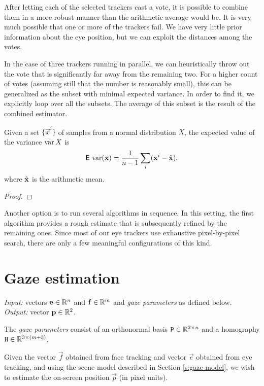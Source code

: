 After letting each of the selected trackers cast a vote, it is possible to combine them in a more robust manner than the arithmetic average would be.
It is very much possible that one or more of the trackers fail.
We have very little prior information about the eye position, but we can exploit the distances among the votes.

In the case of three trackers running in parallel, we can heuristically throw out the vote that is significantly far away from the remaining two.
For a higher count of votes (assuming still that the number is reasonably small), this can be generalized as the subset with minimal expected variance.
In order to find it, we explicitly loop over all the subsets.
The average of this subset is the result of the combined estimator.

\begin{lemma}
Given a set $\{\vec x^i\}$ of samples from a normal distribution $X$, the expected value of the variance $\operatorname{\textrm{var}} X$ is
$$\operatorname{\textsf{E}\,}\operatorname{\textrm{var}} (\mathbf{x}) = \frac 1 {n - 1} \sum_i (\mathbf{x}^i - \hat{\mathbf{x}}),$$
where $\hat{\mathbf{x}}$ is the arithmetic mean.
\end{lemma}
\begin{proof}
\end{proof}

Another option is to run several algorithms in sequence.
In this setting, the first algorithm provides a rough estimate that is subsequently refined by the remaining ones.
Since most of our eye trackers use exhaustive pixel-by-pixel search, there are only a few meaningful configurations of this kind.

\section{Gaze estimation}

\textit{Input:} vectors $\mathbf{e} \in \mathbb{R}^n$ and $\mathbf{f} \in \mathbb{R}^m$ and \textit{gaze parameters} as defined below.\\
\textit{Output:} vector $\mathbf{p} \in \mathbb{R}^2$.\\

\begin{definition} \label{d:gaze-parameters}
The \textit{gaze parameters} consist of an orthonormal basis $\mathtt{P} \in \mathbb{R}^{2\times n}$ and a homography $\mathtt{H} \in \mathbb{R}^{3 \times (m+3)}$.
\end{definition}

Given the vector $\vec f$ obtained from face tracking and vector $\vec e$ obtained from eye tracking, and using the scene model described in Section \ref{s:gaze-model}, we wish to estimate the on-screen position $\vec p$ (in pixel units).

